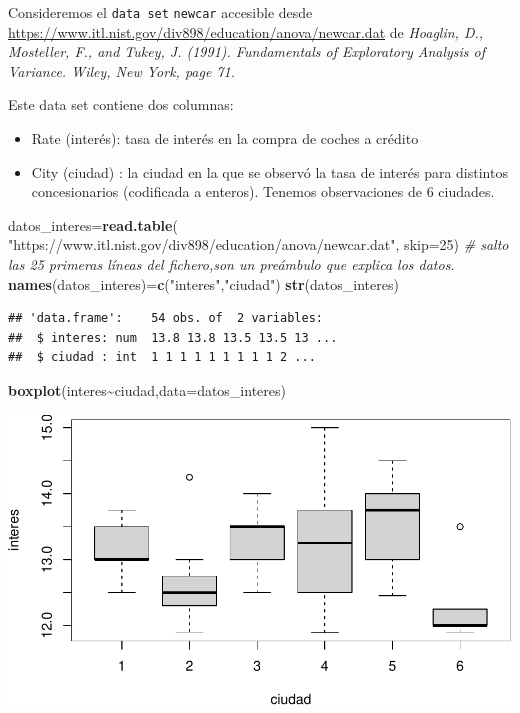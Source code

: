 \documentclass[
]{article}
\newenvironment{Shaded}{\begin{snugshade}}{\end{snugshade}}
\newcommand{\CommentTok}[1]{\textcolor[rgb]{0.56,0.35,0.01}{\textit{#1}}}
\newcommand{\DataTypeTok}[1]{\textcolor[rgb]{0.13,0.29,0.53}{#1}}
\newcommand{\DecValTok}[1]{\textcolor[rgb]{0.00,0.00,0.81}{#1}}
\newcommand{\KeywordTok}[1]{\textcolor[rgb]{0.13,0.29,0.53}{\textbf{#1}}}
\newcommand{\NormalTok}[1]{#1}
\newcommand{\OperatorTok}[1]{\textcolor[rgb]{0.81,0.36,0.00}{\textbf{#1}}}
\newcommand{\StringTok}[1]{\textcolor[rgb]{0.31,0.60,0.02}{#1}}
\providecommand{\tightlist}{%
  \setlength{\itemsep}{0pt}\setlength{\parskip}{0pt}}
\begin{document}
Consideremos el \texttt{data\ set} \texttt{newcar} accesible desde
\url{https://www.itl.nist.gov/div898/education/anova/newcar.dat} de
\emph{Hoaglin, D., Mosteller, F., and Tukey, J. (1991). Fundamentals of
Exploratory Analysis of Variance. Wiley, New York, page 71.}

Este data set contiene dos columnas:

\begin{itemize}
\tightlist
\item
  Rate (interés): tasa de interés en la compra de coches a crédito
\item
  City (ciudad) : la ciudad en la que se observó la tasa de interés para
  distintos concesionarios (codificada a enteros). Tenemos observaciones
  de 6 ciudades.
\end{itemize}

\begin{Shaded}
\begin{Highlighting}[]
\NormalTok{datos\_interes=}\KeywordTok{read.table}\NormalTok{(}
  \StringTok{"https://www.itl.nist.gov/div898/education/anova/newcar.dat"}\NormalTok{,}
  \DataTypeTok{skip=}\DecValTok{25}\NormalTok{)}
\CommentTok{\# salto las 25 primeras líneas del fichero,son un preámbulo que explica los datos.}
\KeywordTok{names}\NormalTok{(datos\_interes)=}\KeywordTok{c}\NormalTok{(}\StringTok{"interes"}\NormalTok{,}\StringTok{"ciudad"}\NormalTok{)}
\KeywordTok{str}\NormalTok{(datos\_interes)}
\end{Highlighting}
\end{Shaded}

\begin{verbatim}
## 'data.frame':    54 obs. of  2 variables:
##  $ interes: num  13.8 13.8 13.5 13.5 13 ...
##  $ ciudad : int  1 1 1 1 1 1 1 1 1 2 ...
\end{verbatim}

\begin{Shaded}
\begin{Highlighting}[]
\KeywordTok{boxplot}\NormalTok{(interes}\OperatorTok{\textasciitilde{}}\NormalTok{ciudad,}\DataTypeTok{data=}\NormalTok{datos\_interes)}
\end{Highlighting}
\end{Shaded}

\includegraphics{taller_problemas_resueltos_extra_1_files/figure-latex/unnamed-chunk-20-1.pdf}
\end{document}
